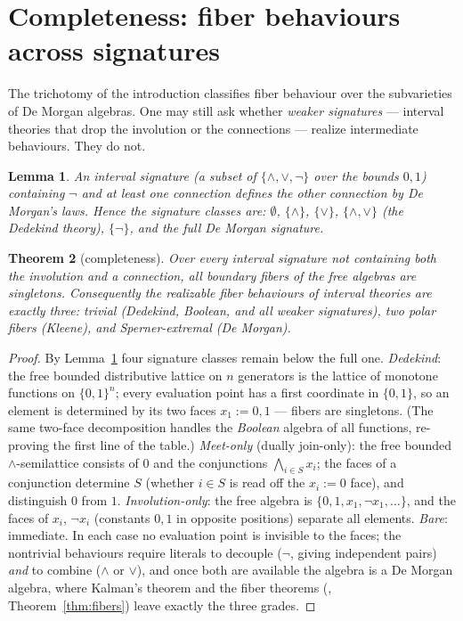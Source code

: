 \documentclass[11pt]{amsart}
\newtheorem{thm}{Theorem}[section]
\newtheorem{lem}[thm]{Lemma}
\theoremstyle{definition}
\begin{document}
\section{Completeness: fiber behaviours across signatures}
\label{sec:complete}

The trichotomy of the introduction classifies fiber behaviour over
the subvarieties of De Morgan algebras.  One may still ask whether
\emph{weaker signatures} --- interval theories that drop the
involution or the connections --- realize intermediate behaviours.
They do not.

\begin{lem}
  \label{lem:signature}
  An interval signature (a subset of $\{\wedge, \vee, \neg\}$
  over the bounds $0, 1$) containing $\neg$ and at least one
  connection defines the other connection by De Morgan's laws.
  Hence the signature classes are: $\emptyset$, $\{\wedge\}$,
  $\{\vee\}$, $\{\wedge,\vee\}$ (the Dedekind theory),
  $\{\neg\}$, and the full De Morgan signature.
\end{lem}

\begin{thm}[completeness]
  \label{thm:complete}
  Over every interval signature not containing both the involution
  and a connection, all boundary fibers of the free algebras are
  singletons.  Consequently the realizable fiber behaviours of
  interval theories are exactly three: trivial (Dedekind, Boolean,
  and all weaker signatures), two polar fibers (Kleene), and
  Sperner-extremal (De Morgan).
\end{thm}

\begin{proof}
  By Lemma~\ref{lem:signature} four signature classes remain below
  the full one.  \emph{Dedekind}: the free bounded distributive
  lattice on $n$ generators is the lattice of monotone functions on
  $\{0,1\}^n$; every evaluation point has a first coordinate in
  $\{0,1\}$, so an element is determined by its two faces
  $x_1 := 0, 1$ --- fibers are singletons.  (The same two-face
  decomposition handles the \emph{Boolean} algebra of all
  functions, re-proving the first line of the table.)
  \emph{Meet-only} (dually join-only): the free bounded
  $\wedge$-semilattice consists of $0$ and the conjunctions
  $\bigwedge_{i \in S} x_i$; the faces of a conjunction determine
  $S$ (whether $i \in S$ is read off the $x_i := 0$ face), and
  distinguish $0$ from $1$.  \emph{Involution-only}: the free
  algebra is $\{0, 1, x_1, \neg x_1, \dots\}$, and the faces of
  $x_i$, $\neg x_i$ (constants $0, 1$ in opposite positions)
  separate all elements.  \emph{Bare}: immediate.  In each case no
  evaluation point is invisible to the faces; the nontrivial
  behaviours require literals to decouple ($\neg$, giving
  independent pairs) \emph{and} to combine ($\wedge$ or $\vee$),
  and once both are available the algebra is a De Morgan algebra,
  where Kalman's theorem \cite{Kalman} and the fiber theorems
  (\cite{DMFibers}, Theorem~\ref{thm:fibers}) leave exactly the
  three grades.
\end{proof}
\end{document}
